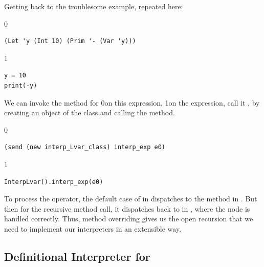 \documentclass[7x10,nocrop]{TimesAPriori_MIT}%
\def\racketEd{0}
\def\pythonEd{1}
\def\edition{1}
\newcommand{\racket}[1]{{\if\edition\racketEd{#1}\fi}}
\newcommand{\python}[1]{{\if\edition\pythonEd #1\fi}}
\begin{document}
Getting back to the troublesome example, repeated here:
{\if\edition\racketEd  
\begin{lstlisting}
(Let 'y (Int 10) (Prim '- (Var 'y)))
\end{lstlisting}
\fi}
{\if\edition\pythonEd
\begin{lstlisting}
y = 10
print(-y)
\end{lstlisting}
\fi}
\noindent We can invoke the  method for \LangVar{}
\racket{on this expression,}
\python{on the  expression,}
%
call it , by creating an object of the \LangVar{} class
and calling the  method.
{\if\edition\racketEd
\begin{lstlisting}
(send (new interp_Lvar_class) interp_exp e0)
\end{lstlisting}
\fi}
{\if\edition\pythonEd
\begin{lstlisting}
InterpLvar().interp_exp(e0)
\end{lstlisting}
\fi}
\noindent To process the \code{-} operator, the default case of
 in \LangVar{} dispatches to the 
method in \LangInt{}. But then for the recursive method call, it
dispatches back to  in \LangVar{}, where the
 node is handled correctly. Thus, method overriding gives us
the open recursion that we need to implement our interpreters in an
extensible way.


\subsection{Definitional Interpreter for \LangVar{}}
\label{sec:interp-Lvar}
\end{document}
